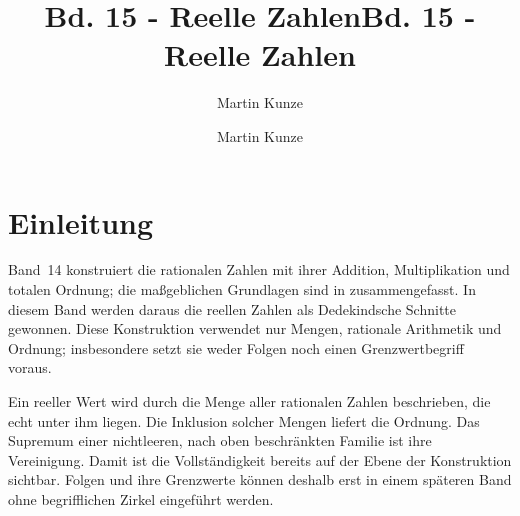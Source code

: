 \documentclass[main.tex]{subfiles}
\title{Bd. 15 - Reelle Zahlen}
\author{Martin Kunze}
\date{}
\begin{document}
\title{Bd. 15 - Reelle Zahlen}
\author{Martin Kunze}
\date{}
\hypersetup{pageanchor=false}
\maketitle
\hypersetup{pageanchor=true}
\setcounter{tocdepth}{3}
\tableofcontents
\setcounter{file}{15}
\renewcommand{\FormulaBandID}{15}

\providecommand{\RealCut}[1]{\operatorname{Cut}_{\mathbb Q}\!\left(#1\right)}
\providecommand{\RealHat}[1]{\widehat{#1}}
\providecommand{\RealEmb}{\iota_{\mathbb R}}
\providecommand{\RealLe}{\mathrel{\leq_{\mathbb R}}}
\providecommand{\RealLt}{\mathrel{<_{\mathbb R}}}
\providecommand{\RealZero}{0_{\mathbb R}}
\providecommand{\RealOne}{1_{\mathbb R}}
\providecommand{\RealAdd}{\mathbin{\oplus}}
\providecommand{\RealMul}{\mathbin{\odot}}
\providecommand{\RealPosMul}{\mathbin{\odot_{+}}}
\providecommand{\RealNeg}[1]{\mathop{\ominus}\!#1}
\providecommand{\RealPosInv}[1]{\operatorname{inv}_{+}\!\left(#1\right)}
\providecommand{\RealInv}[1]{\operatorname{inv}_{\mathbb R}\!\left(#1\right)}
\providecommand{\RealAbs}[1]{\left\lvert #1\right\rvert_{\mathbb R}}
\providecommand{\RealDist}[2]{d_{\mathbb R}\!\left(#1,#2\right)}
\providecommand{\CompleteOrderedField}[1]{\mathsf{COF}\!\left(#1\right)}

\chapter{Einleitung}

Band~14 konstruiert die rationalen Zahlen mit ihrer Addition,
Multiplikation und totalen Ordnung; die maßgeblichen Grundlagen sind in
 zusammengefasst. In diesem Band
werden daraus die reellen Zahlen als Dedekindsche Schnitte gewonnen. Diese
Konstruktion verwendet nur Mengen, rationale Arithmetik und Ordnung;
insbesondere setzt sie weder Folgen noch einen Grenzwertbegriff voraus.

Ein reeller Wert wird durch die Menge aller rationalen Zahlen beschrieben,
die echt unter ihm liegen. Die Inklusion solcher Mengen liefert die Ordnung.
Das Supremum einer nichtleeren, nach oben beschränkten Familie ist ihre
Vereinigung. Damit ist die Vollständigkeit bereits auf der Ebene der
Konstruktion sichtbar. Folgen und ihre Grenzwerte können deshalb erst in
einem späteren Band ohne begrifflichen Zirkel eingeführt werden.
\end{document}
